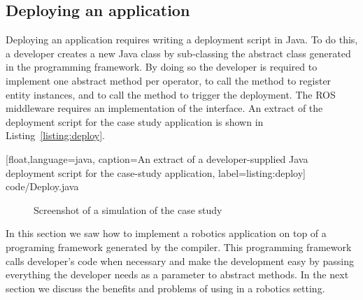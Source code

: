 \subsection{Deploying an application}

Deploying an application requires writing a deployment script in Java.
To do this, a developer creates a new Java class by sub-classing the
abstract class  generated in the programming framework.
By doing so the developer is required to implement one abstract method
per operator, to call the  method to register entity
instances, and to call the  method to trigger the
deployment. The ROS middleware requires an implementation of the
 interface. An extract of the deployment script for the
case study application is shown in Listing~\ref{listing:deploy}.

%
[float,language=java,%
caption={An extract of a developer-supplied Java deployment script for
  the case-study application},%
label={listing:deploy}]%
{code/Deploy.java}


\begin{figure}
  \centering
  \caption{Screenshot of a simulation of the case study}
\label{fig:diaspec-simulation}
\end{figure}

In this section we saw how to implement a robotics application on top
of a programing framework generated by the \diaspec{} compiler. This
programming framework calls developer's code when necessary and make
the development easy by passing everything the developer needs as a
parameter to abstract methods. In the next section we discuss the
benefits and problems of using \diaspec{} in a robotics setting.
